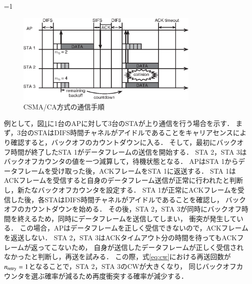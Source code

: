 \documentclass[master]{kuisthesis}		%
\newcounter{flagFig}
\begin{document}
			\par
			\ifnum\value{flagFig}=1{
			\begin{figure}[htbp]
				\begin{center}
					\includegraphics[width=0.8\textwidth]{fig/csmaca.eps}
					\caption{CSMA/CA方式の通信手順}
					\label{fig:csmaca}
				\end{center}
			\end{figure}}\fi
			例として，図\ref{fig:csmaca}に1台のAPに対して3台のSTAが上り通信を行う場合を示す．
			まず，3台のSTAはDIFS時間チャネルがアイドルであることをキャリアセンスにより確認すると，バックオフのカウントダウンに入る．
			そして，最初にバックオフ時間が終了したSTA 1がデータフレームの送信を開始する．
			STA 2，STA 3はバックオフカウンタの値を一つ減算して，待機状態となる．
			APはSTA 1からデータフレームを受け取った後，ACKフレームをSTA 1に返送する．
			STA 1はACKフレームを受信すると自身のデータフレーム送信が正常に行われたと判断し，新たなバックオフカウンタを設定する．
			STA 1が正常にACKフレームを受信した後，各STAはDIFS時間チャネルがアイドルであることを確認し，
			バックオフのカウントダウンを始める．
			その後，STA 2，STA 3が同時にバックオフ時間を終えるため，同時にデータフレームを送信してしまい，
			衝突が発生している．
			この場合，APはデータフレームを正しく受信できないので，ACKフレームを返送しない．
			STA 2，STA 3はACKタイムアウト分の時間を待ってもACKフレームが返ってこないため，
			自身が送信したデータフレームが正しく受信されなかったと判断し，再送を試みる．
			この際，式\eqref{eq:cw}における再送回数が$n_{\rm retry}=1$となることで，STA 2，STA 3のCWが大きくなり，
			同じバックオフカウンタを選ぶ確率が減るため再度衝突する確率が減少する．
\end{document}
